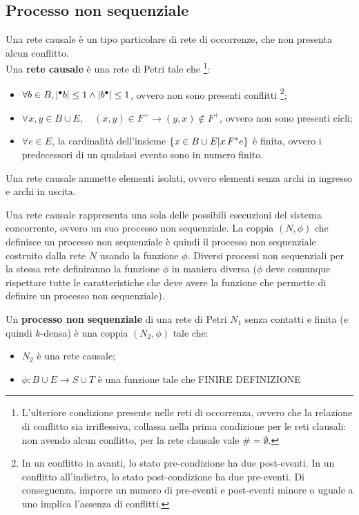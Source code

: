 \subsection*{Processo non sequenziale}
Una rete causale è un tipo particolare di rete di occorrenze, che non presenta
alcun conflitto.\\
Una \textbf{rete causale} è una rete di Petri tale che
\footnote[][-1cm]{L'ulteriore condizione presente nelle reti di occorrenza,
ovvero che la relazione di conflitto sia irriflessiva, collassa nella prima
condizione per le reti clausali: non avendo alcun conflitto, per la rete
clausale vale $\# = \emptyset$.}:
\begin{itemize}
    \item $\forall b \in B, \lvert {^\bullet}b \rvert \le 1 \land \lvert b^\bullet \rvert \le 1$,
    ovvero non sono presenti conflitti \footnote[][1cm]{In un conflitto in
    avanti, lo stato pre-condizione ha due post-eventi. In un conflitto
    all'indietro, lo stato post-condizione ha due pre-eventi. Di conseguenza,
    imporre un numero di pre-eventi e post-eventi minore o uguale a uno implica
    l'assenza di conflitti.};
    \item $\forall x, y \in B \cup E, \quad (x, y) \in F^+ \rightarrow (y, x) \notin F^+$,
    ovvero non sono presenti cicli;
    \item $\forall e \in E$, la cardinalità dell'insieme $\left\{x \in B \cup E | x \, F^* e\right\}$
    è finita, ovvero i predecessori di un qualsiasi evento sono in numero
    finito.
\end{itemize}

\begin{rem}
    Una rete causale ammette elementi isolati, ovvero elementi senza archi
    in ingresso e archi in uscita.
\end{rem}

Una rete causale rappresenta una sola delle possibili esecuzioni del sistema
concorrente, ovvero un suo processo non sequenziale.
La coppia $(N, \phi)$ che definisce un processo non sequenziale
è quindi il processo non sequenziale costruito dalla rete $N$ usando la
funzione $\phi$. Diversi processi non sequenziali per la stessa rete
definiranno la funzione $\phi$ in maniera diversa ($\phi$ deve comunque
rispettare tutte le caratteristiche che deve avere la funzione che permette
di definire un processo non sequenziale).

\begin{defn}
    Un \textbf{processo non sequenziale} di una rete di Petri $N_1$
    senza contatti e finita (e quindi $k$-densa) è una coppia $(N_2, \phi)$
    tale che:
    \begin{itemize}
        \item $N_2$ è una rete causale;
        \item $\phi: B \cup E \rightarrow S \cup T$ è una funzione tale che
        FINIRE DEFINIZIONE
    \end{itemize}
\end{defn}

